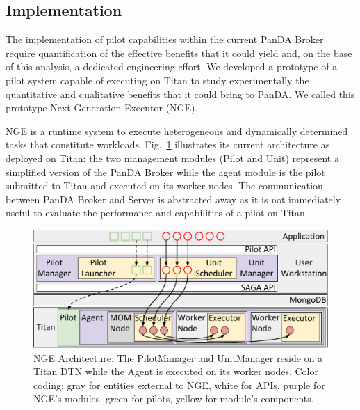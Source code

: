 \subsection{Implementation}
\label{sec:arch}

The implementation of pilot capabilities within the current PanDA Broker require
quantification of the effective benefits that it could yield and, on the base of
this analysis, a dedicated engineering effort. We developed a prototype of a
pilot system capable of executing on Titan to study experimentally the
quantitative and qualitative benefits that it could bring to PanDA. We called
this prototype Next Generation Executor (NGE).

NGE is a runtime system to execute heterogeneous and dynamically determined
tasks that constitute workloads. Fig.~\ref{fig:arch-overview} illustrates its
current architecture as deployed on Titan: the two management modules (Pilot
and Unit) represent a simplified version of the PanDA Broker while the agent
module is the pilot submitted to Titan and executed on its worker nodes. The
communication between PanDA Broker and Server is abstracted away as it
is not immediately useful to evaluate the performance and capabilities of a
pilot on Titan.

\begin{figure}
  \centering
   \includegraphics[width=\columnwidth]{figures/rp_architecture_compact_atlaswms_paper.pdf}
   \vspace{-0.3in}
  \caption{NGE Architecture: The PilotManager and  UnitManager reside on a Titan
  DTN while the Agent is executed on its worker nodes. Color coding: gray for
  entities external to NGE, white for APIs, purple for NGE's modules, green for
  pilots, yellow for module's components.}
\label{fig:arch-overview}
\end{figure}

